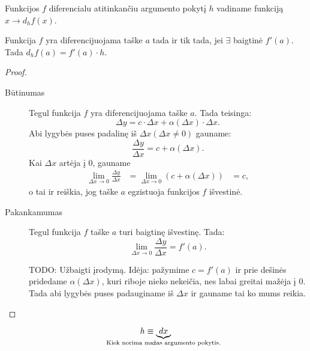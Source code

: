 \begin{defn}
  Funkcijos $f$ diferencialu atitinkančiu argumento pokytį $h$ vadiname
  funkciją $x \to d_{h} f(x)$.
\end{defn}

\begin{prop}
  Funkcija $f$ yra diferencijuojama taške $a$ tada ir tik tada, jei
  $\exists$ baigtinė $f'(a)$. Tada $d_{h} f(a) = f'(a) \cdot h$.
  \begin{proof}
    \begin{description}
      \item[Būtinumas] Tegul funkcija $f$ yra diferencijuojama taške 
        $a$. Tada teisinga:
        \begin{equation*}
          \Delta y = c \cdot \Delta x + \alpha(\Delta x) \cdot \Delta x.
        \end{equation*}
        Abi lygybės puses padalinę iš $\Delta x (\Delta x \neq 0)$ gauname:
        \begin{equation*}
          \frac{\Delta y}{\Delta x} = c + \alpha(\Delta x).
        \end{equation*}
        Kai $\Delta x$ artėja į 0, gauname
        \begin{align*}
          \lim _{\Delta x \to 0} \frac{\Delta y}{\Delta x}
          &= \lim _{\Delta x \to 0} (c + \alpha(\Delta x))
          &= c,
        \end{align*}
        o tai ir reiškia, jog taške $a$ egzistuoja funkcijos $f$ išvestinė.
      \item[Pakankamumas] Tegul funkcija $f$ taške $a$ turi baigtinę 
        išvestinę. Tada:
        \begin{equation*}
          \lim _{\Delta x \to 0} \frac{\Delta y}{\Delta x} = f'(a).
        \end{equation*}

        TODO: Užbaigti įrodymą. Idėja: pažymime $c = f'(a)$ ir prie
        dešinės pridedame $\alpha(\Delta x)$, kuri riboje nieko nekeičia,
        nes labai greitai mažėja į 0. Tada abi lygybės puses padauginame 
        iš $\Delta x$ ir gauname tai ko mums reikia.
    \end{description}
  \end{proof}
\end{prop}

\begin{notation}
  \begin{equation*}
    h \equiv \underbrace{dx}_{\mathclap{
      \text{Kiek norima mažas argumento pokytis.}}}
  \end{equation*}
\end{notation}

